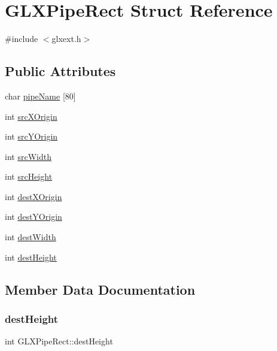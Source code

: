 \hypertarget{struct_g_l_x_pipe_rect}{}\section{G\+L\+X\+Pipe\+Rect Struct Reference}
\label{struct_g_l_x_pipe_rect}


{\ttfamily \#include $<$glxext.\+h$>$}

\subsection*{Public Attributes}
\begin{DoxyCompactItemize}
\item 
char \hyperlink{struct_g_l_x_pipe_rect_a88e732f4d56b659b0366aabd6bc362dc}{pipe\+Name} \mbox{[}80\mbox{]}
\item 
int \hyperlink{struct_g_l_x_pipe_rect_a9df2313c01f75d149e64f2ff467bc266}{src\+X\+Origin}
\item 
int \hyperlink{struct_g_l_x_pipe_rect_a1f7316dff7050ab2ce9d3d37f8c5450e}{src\+Y\+Origin}
\item 
int \hyperlink{struct_g_l_x_pipe_rect_a2c6c180a4dabb71076366e06a1c7d0ef}{src\+Width}
\item 
int \hyperlink{struct_g_l_x_pipe_rect_a35632524bce6bffa05f284a9b1c1b8ff}{src\+Height}
\item 
int \hyperlink{struct_g_l_x_pipe_rect_a8b7b941894ad3420326d7e9fa885bb71}{dest\+X\+Origin}
\item 
int \hyperlink{struct_g_l_x_pipe_rect_aef7766b02ef07c20a11e89da5878b469}{dest\+Y\+Origin}
\item 
int \hyperlink{struct_g_l_x_pipe_rect_a3c07991d2a8fb6e973eae834650b3dad}{dest\+Width}
\item 
int \hyperlink{struct_g_l_x_pipe_rect_a858b0ea6642e451495aff35cfefbd083}{dest\+Height}
\end{DoxyCompactItemize}


\subsection{Member Data Documentation}
\mbox{\label{struct_g_l_x_pipe_rect_a858b0ea6642e451495aff35cfefbd083}} 
\subsubsection{\texorpdfstring{dest\+Height}{destHeight}}
{\footnotesize\ttfamily int G\+L\+X\+Pipe\+Rect\+::dest\+Height}

